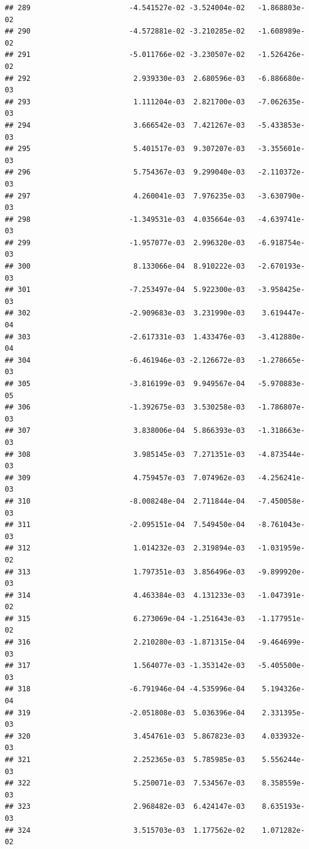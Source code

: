 \documentclass[
]{article}
\begin{document}
\begin{verbatim}
## 289                       -4.541527e-02 -3.524004e-02   -1.868803e-02
## 290                       -4.572881e-02 -3.210285e-02   -1.608989e-02
## 291                       -5.011766e-02 -3.230507e-02   -1.526426e-02
## 292                        2.939330e-03  2.680596e-03   -6.886680e-03
## 293                        1.111204e-03  2.821700e-03   -7.062635e-03
## 294                        3.666542e-03  7.421267e-03   -5.433853e-03
## 295                        5.401517e-03  9.307207e-03   -3.355601e-03
## 296                        5.754367e-03  9.299040e-03   -2.110372e-03
## 297                        4.260041e-03  7.976235e-03   -3.630790e-03
## 298                       -1.349531e-03  4.035664e-03   -4.639741e-03
## 299                       -1.957077e-03  2.996320e-03   -6.918754e-03
## 300                        8.133066e-04  8.910222e-03   -2.670193e-03
## 301                       -7.253497e-04  5.922300e-03   -3.958425e-03
## 302                       -2.909683e-03  3.231990e-03    3.619447e-04
## 303                       -2.617331e-03  1.433476e-03   -3.412880e-04
## 304                       -6.461946e-03 -2.126672e-03   -1.278665e-03
## 305                       -3.816199e-03  9.949567e-04   -5.970883e-05
## 306                       -1.392675e-03  3.530258e-03   -1.786807e-03
## 307                        3.838006e-04  5.866393e-03   -1.318663e-03
## 308                        3.985145e-03  7.271351e-03   -4.873544e-03
## 309                        4.759457e-03  7.074962e-03   -4.256241e-03
## 310                       -8.008248e-04  2.711844e-04   -7.450058e-03
## 311                       -2.095151e-04  7.549450e-04   -8.761043e-03
## 312                        1.014232e-03  2.319894e-03   -1.031959e-02
## 313                        1.797351e-03  3.856496e-03   -9.899920e-03
## 314                        4.463384e-03  4.131233e-03   -1.047391e-02
## 315                        6.273069e-04 -1.251643e-03   -1.177951e-02
## 316                        2.210280e-03 -1.871315e-04   -9.464699e-03
## 317                        1.564077e-03 -1.353142e-03   -5.405500e-03
## 318                       -6.791946e-04 -4.535996e-04    5.194326e-04
## 319                       -2.051808e-03  5.036396e-04    2.331395e-03
## 320                        3.454761e-03  5.867823e-03    4.033932e-03
## 321                        2.252365e-03  5.785985e-03    5.556244e-03
## 322                        5.250071e-03  7.534567e-03    8.358559e-03
## 323                        2.968482e-03  6.424147e-03    8.635193e-03
## 324                        3.515703e-03  1.177562e-02    1.071282e-02

\end{verbatim}
\end{document}

